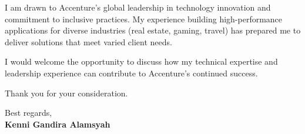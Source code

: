 \documentclass[11pt]{article}
\begin{document}
\vspace{0.3cm}

I am drawn to Accenture's global leadership in technology innovation and commitment to inclusive practices. My experience building high-performance applications for diverse industries (real estate, gaming, travel) has prepared me to deliver solutions that meet varied client needs.

\vspace{0.3cm}

I would welcome the opportunity to discuss how my technical expertise and leadership experience can contribute to Accenture's continued success.

\vspace{0.3cm}

Thank you for your consideration.

\vspace{0.3cm}

Best regards,\\
\textbf{Kenni Gandira Alamsyah}
\end{document}

